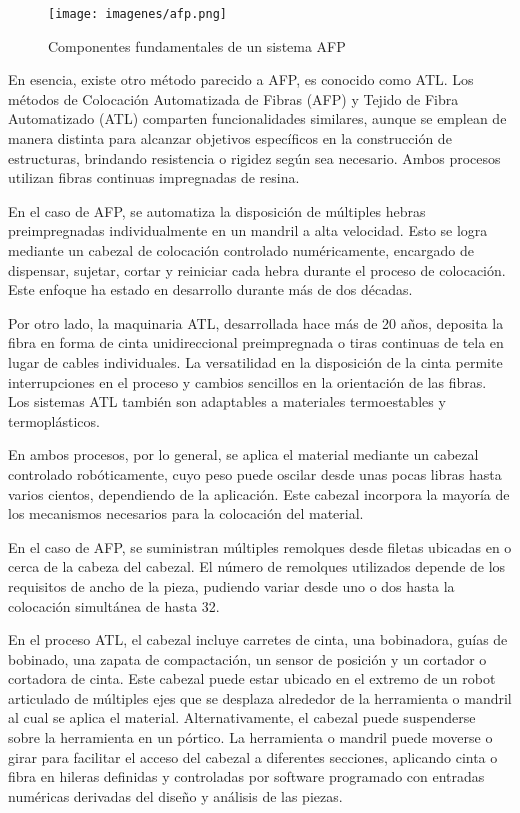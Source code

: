 \begin{figure}[H]
\begin{center}
\texttt{[image: imagenes/afp.png]}
\caption{Componentes fundamentales de un sistema AFP}
\label{afp}
\end{center}
\end{figure}
En esencia, existe otro método parecido a AFP, es conocido como ATL.
Los métodos de Colocación Automatizada de Fibras (AFP) y Tejido de Fibra Automatizado (ATL) comparten funcionalidades similares, aunque se emplean de manera distinta para alcanzar objetivos específicos en la construcción de estructuras, brindando resistencia o rigidez según sea necesario. Ambos procesos utilizan fibras continuas impregnadas de resina.

En el caso de AFP, se automatiza la disposición de múltiples hebras preimpregnadas individualmente en un mandril a alta velocidad. Esto se logra mediante un cabezal de colocación controlado numéricamente, encargado de dispensar, sujetar, cortar y reiniciar cada hebra durante el proceso de colocación. Este enfoque ha estado en desarrollo durante más de dos décadas.

Por otro lado, la maquinaria ATL, desarrollada hace más de 20 años, deposita la fibra en forma de cinta unidireccional preimpregnada o tiras continuas de tela en lugar de cables individuales. La versatilidad en la disposición de la cinta permite interrupciones en el proceso y cambios sencillos en la orientación de las fibras. Los sistemas ATL también son adaptables a materiales termoestables y termoplásticos.

En ambos procesos, por lo general, se aplica el material mediante un cabezal controlado robóticamente, cuyo peso puede oscilar desde unas pocas libras hasta varios cientos, dependiendo de la aplicación. Este cabezal incorpora la mayoría de los mecanismos necesarios para la colocación del material.

En el caso de AFP, se suministran múltiples remolques desde filetas ubicadas en o cerca de la cabeza del cabezal. El número de remolques utilizados depende de los requisitos de ancho de la pieza, pudiendo variar desde uno o dos hasta la colocación simultánea de hasta 32.

En el proceso ATL, el cabezal incluye carretes de cinta, una bobinadora, guías de bobinado, una zapata de compactación, un sensor de posición y un cortador o cortadora de cinta. Este cabezal puede estar ubicado en el extremo de un robot articulado de múltiples ejes que se desplaza alrededor de la herramienta o mandril al cual se aplica el material. Alternativamente, el cabezal puede suspenderse sobre la herramienta en un pórtico. La herramienta o mandril puede moverse o girar para facilitar el acceso del cabezal a diferentes secciones, aplicando cinta o fibra en hileras definidas y controladas por software programado con entradas numéricas derivadas del diseño y análisis de las piezas.

